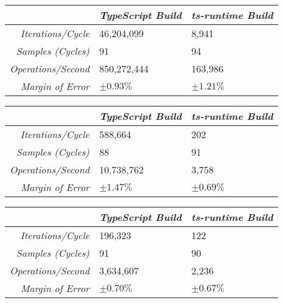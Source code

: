 \begin{center}
{
\centering
\tabulinesep=1.2mm
\setlength{\tabcolsep}{5mm}
\def\arraystretch{1.25}
\small
\begin{tabu} to \textwidth {|r||X[c,m]|X[c,m]|}
  \hline
  & \emph{TypeScript Build} & \emph{ts-runtime Build} \\
  \hline
  \hline
  \emph{Iterations/Cycle}  & 46,204,099 & 8,941 \\
  \hline
  \emph{Samples (Cycles)}  & 91 & 94 \\
  \hline
  \emph{Operations/Second} & 850,272,444 & 163,986 \\
  \hline
  \emph{Margin of Error}   & $\pm 0.93\%$ & $\pm 1.21\%$ \\
  \hline
\end{tabu}
}
\end{center}

\begin{center}
{
\centering
\tabulinesep=1.2mm
\setlength{\tabcolsep}{5mm}
\def\arraystretch{1.25}
\small
\begin{tabu} to \textwidth {|r||X[c,m]|X[c,m]|}
  \hline
  & \emph{TypeScript Build} & \emph{ts-runtime Build} \\
  \hline
  \hline
  \emph{Iterations/Cycle}  & 588,664 & 202 \\
  \hline
  \emph{Samples (Cycles)}  & 88 & 91 \\
  \hline
  \emph{Operations/Second} & 10,738,762 & 3,758 \\
  \hline
  \emph{Margin of Error}   & $\pm 1.47\%$ & $\pm 0.69\%$ \\
  \hline
\end{tabu}
}
\end{center}

\begin{center}
{
\centering
\tabulinesep=1.2mm
\setlength{\tabcolsep}{5mm}
\def\arraystretch{1.25}
\small
\begin{tabu} to \textwidth {|r||X[c,m]|X[c,m]|}
  \hline
  & \emph{TypeScript Build} & \emph{ts-runtime Build} \\
  \hline
  \hline
  \emph{Iterations/Cycle}  & 196,323 & 122 \\
  \hline
  \emph{Samples (Cycles)}  & 91 & 90 \\
  \hline
  \emph{Operations/Second} & 3,634,607 & 2,236 \\
  \hline
  \emph{Margin of Error}   & $\pm 0.70\%$ & $\pm 0.67\%$ \\
  \hline
\end{tabu}
}
\end{center}


